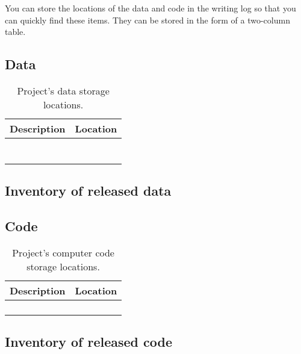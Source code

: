 \documentclass[10pt,letterpaper]{article}
\begin{document}
You can store the locations of the data and code in the writing log so that you can quickly find these items.
They can be stored in the form of a two-column table.

\subsection*{Data}

\begin{table}
    \centering
    \begin{tabular}{cc}
        Description & Location\\
        \toprule
         & \\
         & \\
         & \\
         & \\
         & \\
         & \\
         & \\
         \bottomrule
    \end{tabular}
    \caption{Project's data storage locations.}
    \label{tab:my_label}
\end{table}

\subsection{Inventory of released data}

\subsection*{Code}


\begin{table}
    \centering
    \begin{tabular}{cc}
        Description & Location\\
        \toprule
         & \\
         & \\
         & \\
         & \\
         \bottomrule
    \end{tabular}
    \caption{Project's computer code storage locations.}
    \label{tab:my_label}
\end{table}



\subsection{Inventory of released code}
\end{document}
